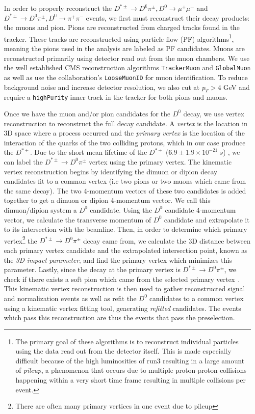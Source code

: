 In order to properly reconstruct the $D^{*\pm} \to D^0 \pi^\pm, D^0 \to \mu^+ \mu^-$ and $D^{*\pm} \to D^0 \pi^\pm, D^0 \to \pi^+ \pi^-$ events, we first must reconstruct their decay products: the muons and pion. Pions are reconstructed from charged tracks found in the tracker. These tracks are reconstructed using particle flow (PF) algorithms\footnote{The primary goal of these algorithms is to reconstruct individual particles using the data read out from the detector itself. This is made especially difficult because of the high luminosities of run3 resulting in a large amount of \textit{pileup}, a phenomenon that occurs due to multiple proton-proton collisions happening within a very short time frame resulting in multiple collisions per event. }, meaning the pions used in the analysis are labeled as PF candidates. Muons are reconstructed primarily using detector read out from the muon chambers. We use the well established CMS reconstruction algorithms \texttt{TrackerMuon} and \texttt{GlobalMuon} as well as use the collaboration's \texttt{LooseMuonID} for muon identification. To reduce background noise and increase detector resolution, we also cut at $p_T>4$ GeV and require a \texttt{highPurity} inner track in the tracker for both pions and muons.

Once we have the muon and/or pion candidates for the $D^0$ decay, we use vertex reconstruction to reconstruct the full decay candidate. A \textit{vertex} is the location in 3D space where a process occurred and the \textit{primary vertex} is the location of the interaction of the quarks of the two colliding protons, which in our case produce the $D^{*\pm}$. Due to the short mean lifetime of the $D^{*\pm}$ ($ 6.9 \pm 1.9 \times 10^{-21} \; s$) \cite{ref:pdg2024}, we can label the $D^{*\pm} \to D^0 \pi^\pm$ vertex using the primary vertex. The kinematic vertex reconstruction begins by identifying the dimuon or dipion decay candidates fit to a common vertex (i.e two pions or two muons which came from the same decay). The two 4-momentum vectors of these two candidates is added together to get a dimuon or dipion 4-momentum vector. We call this dimuon/dipion system a $D^0$ candidate. Using the $D^0$ candidate 4-momentum vector, we calculate the transverse momentum of $D^0$ candidate and extrapolate it to its intersection with the beamline. Then, in order to determine which primary vertex\footnote{There are often many primary vertices in one event due to pileup} the $D^{*\pm} \to D^0 \pi^\pm$ decay came from, we calculate the 3D distance between each primary vertex candidate and the extrapolated intersection point, known as the \textit{3D-impact parameter}, and find the primary vertex which minimizes this parameter. Lastly, since the decay at the primary vertex is $D^{*\pm} \to D^0 \pi^\pm$, we check if there exists a soft pion which came from the selected primary vertex \cite{ref:Prokofiev_Speer_2005}. This kinematic vertex reconstruction is then used to gather reconstructed signal and normalization events as well as refit the $D^0$ candidates to a common vertex using a kinematic vertex fitting tool, generating \textit{refitted} candidates. The events which pass this reconstruction are thus the events that pass the preselection. 

